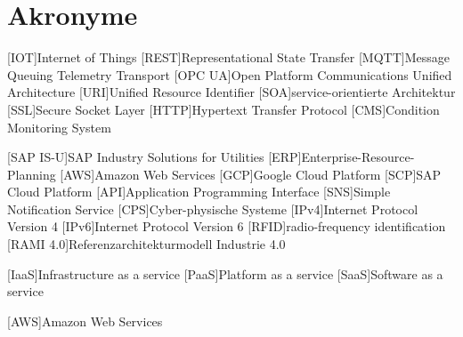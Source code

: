 \section*{Akronyme}            %
\begin{acronym}[SAP IS-U]
  [IOT]{Internet of Things}
  [REST]{Representational State Transfer}
  [MQTT]{Message Queuing Telemetry Transport}
  [OPC UA]{Open Platform Communications Unified Architecture}
  [URI]{Unified Resource Identifier}
  [SOA]{service-orientierte Architektur}
  [SSL]{Secure Socket Layer}
  [HTTP]{Hypertext Transfer Protocol}
  [CMS]{Condition Monitoring System}

  [SAP IS-U]{SAP Industry Solutions for Utilities}
  [ERP]{Enterprise-Resource-Planning}
  [AWS]{Amazon Web Services}
  [GCP]{Google Cloud Platform}
  [SCP]{SAP Cloud Platform}
  [API]{Application Programming Interface}
  [SNS]{Simple Notification Service}
  [CPS]{Cyber-physische Systeme}
  [IPv4]{Internet Protocol Version 4}
  [IPv6]{Internet Protocol Version 6}
  [RFID]{radio-frequency identification}
  [RAMI 4.0]{Referenzarchitekturmodell Industrie 4.0}

[IaaS]{Infrastructure as a service}
[PaaS]{Platform as a service}
[SaaS]{Software as a service}

[AWS]{Amazon Web Services}

\end{acronym}

\newpage

\listoffigures
{}
\listoftables
{}
\lstlistoflistings
{}
\newpage

